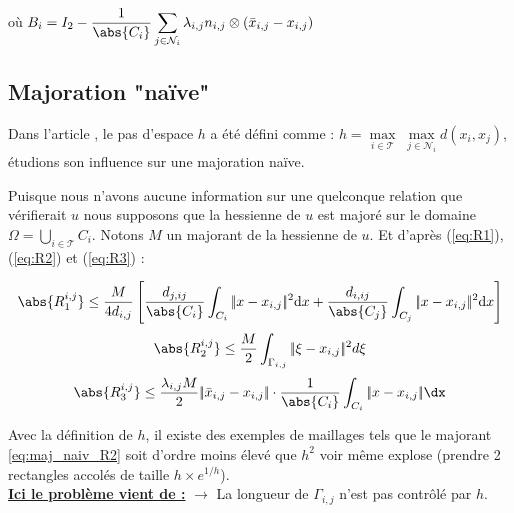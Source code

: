 \documentclass[12pt,a4paper]{article}
\begin{document}
	où $B_i = I_2 - \dfrac1{\abs{C_i}}\displaystyle\sum_{j \in \mathcal N_i} \lambda_{i,j} {n_{i,j}}\otimes\left( {\bar x_{i,j}-x_{i,j}}\right)$
	
	
	\noindent{}
	
	\subsection{Majoration "naïve"}
	
	Dans l'article \cite{ludo}, le pas d'espace $h$ a été défini comme : $h = \underset{i\in \mathcal T}\max\;\underset{j\in \mathcal N_i}\max d(x_i,x_j)$, étudions son influence sur une majoration naïve.
	
	Puisque nous n'avons aucune information sur une quelconque relation que vérifierait $u$ nous supposons que la hessienne de $u$ est majoré sur le domaine $\Omega = \bigcup_{i \in \mathcal T} C_i$. Notons $M$ un majorant de la hessienne de $u$. Et d'après (\ref{eq:R1}), (\ref{eq:R2}) et (\ref{eq:R3}) :
	
	\begin{equation}\label{eq:maj_naiv_R1}
		\abs{R_1^{i,j}} \leq \frac M{4d_{i,j}}\left[\frac{d_{j,ij}}{\abs{C_i}}\displaystyle\int_{C_i} |\!| {x-x_{i,j}}|\!|^2\mathrm d  x + \frac{d_{i,ij}}{\abs{C_j}}\displaystyle\int_{C_j} |\!| {x-x_{i,j}}|\!|^2\mathrm d  x\right]
	\end{equation}
	\begin{equation}\label{eq:maj_naiv_R2}
		\abs{R_2^{i,j}} \leq \dfrac{M}2\displaystyle\int_{\Gamma_{i,j}} |\!| { \xi-x_{i,j}}|\!|^2d \xi
	\end{equation}
	\begin{equation}\label{eq:maj_naiv_R3}
		\abs{R_3^{i,j}} \leq \dfrac{\lambda_{i,j}M}2|\!| {\bar x_{i,j}-x_{i,j}}|\!|\cdot \frac1{\abs{C_i}}\int_{C_i}|\!| {x-  x_{i,j}} |\!|\dx
	\end{equation}
	
	Avec la définition de $h$, il existe des exemples de maillages tels que le majorant \ref{eq:maj_naiv_R2} soit d'ordre moins élevé que $h^2$ voir même explose (prendre 2 rectangles accolés de taille $h\times e^{1/h}$).\\
	
	\textbf{\underline{Ici le problème vient de :}} $\longrightarrow$ La longueur de $\Gamma_{i,j}$  n'est pas contrôlé par $h$.
	
\end{document}
